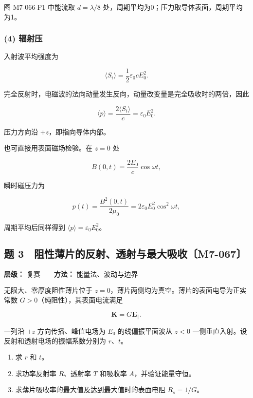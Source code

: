 图 M7-066-P1 中能流取 \(d=\lambda/8\)
处，周期平均为0；压力取导体表面，周期平均为1。

\subsubsection{(4) 辐射压}\label{m7:ux8f90ux5c04ux538b}

入射波平均强度为

\[
\langle S_i\rangle
=\frac12\varepsilon_0cE_0^2.
\]

完全反射时，电磁波的法向动量发生反向，动量改变量是完全吸收时的两倍，因此

\[
\boxed{
\langle p\rangle
=\frac{2\langle S_i\rangle}{c}
=\varepsilon_0E_0^2}.
\]

压力方向沿 \(+z\)，即指向导体内部。

也可直接用表面磁场检验。在 \(z=0\) 处

\[
B(0,t)=\frac{2E_0}{c}\cos\omega t,
\]

瞬时磁压力为

\[
p(t)=\frac{B^2(0,t)}{2\mu_0}
=2\varepsilon_0E_0^2\cos^2\omega t,
\]

周期平均后同样得到 \(\langle p\rangle=\varepsilon_0E_0^2\)。

\par{}
\noindent\begin{minipage}{\linewidth}

\subsection{题
3　阻性薄片的反射、透射与最大吸收〔M7-067〕}\label{m7:ux9898-3-ux963bux6027ux8584ux7247ux7684ux53cdux5c04ux900fux5c04ux4e0eux6700ux5927ux5438ux6536m7-067}

\textbf{层级：} 复赛　　\textbf{方法：} 能量法、波动与边界

无限大、零厚度阻性薄片位于
\(z=0\)，薄片两侧均为真空。薄片的表面电导为正实常数
\(G>0\)（纯阻性），其表面电流满足

\[
\mathbf K=G\mathbf E_{\parallel}.
\]

一列沿 \(+z\) 方向传播、峰值电场为 \(E_0\) 的线偏振平面波从 \(z<0\)
一侧垂直入射。设反射和透射电场的振幅系数分别为 \(r\)、\(t\)。

\begin{enumerate}
\def\labelenumi{(\arabic{enumi})}
\item
  求 \(r\) 和 \(t\)。
\item
  求功率反射率 \(R\)、透射率 \(T\) 和吸收率 \(A\)，并验证能量守恒。
\item
  求薄片吸收率的最大值及达到最大值时的表面电阻 \(R_s=1/G\)。
\end{enumerate}

\end{minipage}\par

